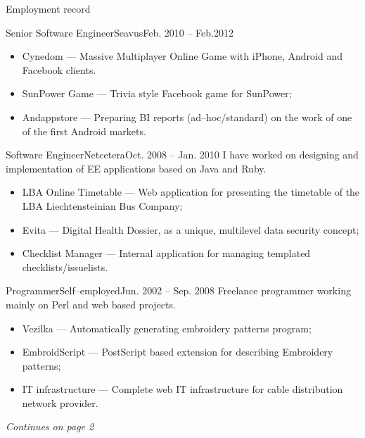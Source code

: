 \documentclass[]{mcdowellcv}
\begin{document}
\begin{cvsection}{Employment record}
\begin{cvsubsection}{Senior Software Engineer}{Seavus}{Feb. 2010 -- Feb.2012}
            \begin{itemize}
                \item Cynedom --- Massive Multiplayer Online Game with iPhone, Android and Facebook clients.
                \item SunPower Game  --- Trivia style Facebook game for SunPower;
                \item Andappstore --- Preparing BI reports (ad--hoc/standard) on the work of one of the first Android markets.
            \end{itemize}
        \end{cvsubsection}
        \begin{cvsubsection}{Software Engineer}{Netcetera}{Oct. 2008 -- Jan. 2010}
            I have worked on designing and implementation of EE applications based on Java and Ruby.
            \begin{itemize}
                \item LBA Online Timetable --- Web application for presenting the timetable of the LBA Liechtensteinian Bus Company;
                \item Evita --- Digital Health Dossier, as a unique, multilevel data security concept;
                \item Checklist Manager --- Internal application for managing templated checklists/issuelists.
            \end{itemize}
        \end{cvsubsection}
        \begin{cvsubsection}{Programmer}{Self--employed}{Jun. 2002 -- Sep. 2008}
            Freelance programmer working mainly on Perl and web based projects.
            \begin{itemize}
                \item Vezilka --- Automatically generating embroidery patterns program;
                \item EmbroidScript --- PostScript based extension for describing Embroidery patterns;
                \item IT infrastructure --- Complete web IT infrastructure for cable distribution network provider.
            \end{itemize}
        \end{cvsubsection}
    \end{cvsection}
    \vspace*{25pt}
    \begin{center}
    \textit{Continues on page 2}
    \end{center}
\end{document}
